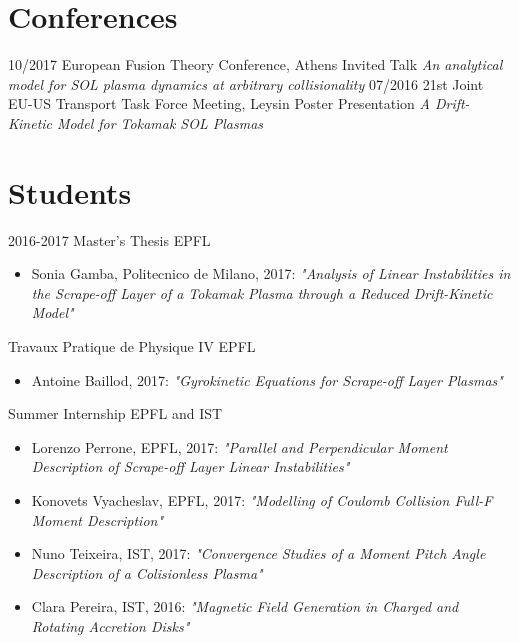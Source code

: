 \documentclass[]{friggeri-cv}
\begin{document}
\section{Conferences}
\begin{entrylist}
  \entry
    {10/2017}
    {European Fusion Theory Conference, Athens}
    {Invited Talk}
    {\emph{An analytical model for SOL plasma dynamics at arbitrary collisionality}}
  \entry
    {07/2016}
    {21st Joint EU-US Transport Task Force Meeting, Leysin}
    {Poster Presentation}
    {\emph{A Drift-Kinetic Model for Tokamak SOL Plasmas}}
\end{entrylist}

\section{Students}
\begin{entrylist}
  \entry
    {2016-2017}
    {Master's Thesis}
    {EPFL}
    {\vspace{-0.4cm}
    \begin{itemize}
    \item Sonia Gamba, Politecnico de Milano, 2017: \emph{"Analysis of Linear Instabilities in the Scrape-off Layer of a Tokamak Plasma through a Reduced Drift-Kinetic Model"}
    \end{itemize}
    }
  \entry
    {}
    {Travaux Pratique de Physique IV}
    {EPFL}
    {\vspace{-0.4cm}
    \begin{itemize}
    \item Antoine Baillod, 2017: \emph{"Gyrokinetic Equations for Scrape-off Layer Plasmas"}
    \end{itemize}
    }
  \entry
    {}
    {Summer Internship}
    {EPFL and IST}
    {\vspace{-0.4cm}
    \begin{itemize}
        \item Lorenzo Perrone, EPFL, 2017: \emph{"Parallel and Perpendicular Moment Description of Scrape-off Layer Linear Instabilities"}
        \item Konovets Vyacheslav, EPFL, 2017: \emph{"Modelling of Coulomb Collision Full-F Moment Description"}
        \item Nuno Teixeira, IST, 2017: \emph{"Convergence Studies of a Moment Pitch Angle Description of a Colisionless Plasma"}
        \item Clara Pereira, IST, 2016: \emph{"Magnetic Field Generation in Charged and Rotating Accretion Disks"}
    \end{itemize}
    }
\end{entrylist}
\end{document}
